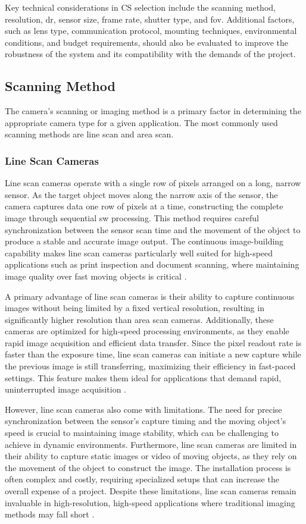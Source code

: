 Key technical considerations in CS selection include the scanning method, resolution, \gls{dr}, sensor size, frame rate, shutter type, and \gls{fov}. Additional factors, such as lens type, communication protocol, mounting techniques, environmental conditions, and budget requirements, should also be evaluated to improve the robustness of the system and its compatibility with the demands of the project.

\subsection{Scanning Method}
The camera's scanning or imaging method is a primary factor in determining the appropriate camera type for a given application. The most commonly used scanning methods are line scan and area scan.

\subsubsection{Line Scan Cameras}
Line scan cameras operate with a single row of pixels arranged on a long, narrow sensor. As the target object moves along the narrow axis of the sensor, the camera captures data one row of pixels at a time, constructing the complete image through sequential \gls{sw} processing. This method requires careful synchronization between the sensor scan time and the movement of the object to produce a stable and accurate image output. The continuous image-building capability makes line scan cameras particularly well suited for high-speed applications such as print inspection and document scanning, where maintaining image quality over fast moving objects is critical \cite{AS_VS_LS_ART}.

A primary advantage of line scan cameras is their ability to capture continuous images without being limited by a fixed vertical resolution, resulting in significantly higher resolution than area scan cameras. Additionally, these cameras are optimized for high-speed processing environments, as they enable rapid image acquisition and efficient data transfer. Since the pixel readout rate is faster than the exposure time, line scan cameras can initiate a new capture while the previous image is still transferring, maximizing their efficiency in fast-paced settings. This feature makes them ideal for applications that demand rapid, uninterrupted image acquisition \cite{AS_VS_LS_ART}.

However, line scan cameras also come with limitations. The need for precise synchronization between the sensor’s capture timing and the moving object’s speed is crucial to maintaining image stability, which can be challenging to achieve in dynamic environments. Furthermore, line scan cameras are limited in their ability to capture static images or video of moving objects, as they rely on the movement of the object to construct the image. The installation process is often complex and costly, requiring specialized setups that can increase the overall expense of a project. Despite these limitations, line scan cameras remain invaluable in high-resolution, high-speed applications where traditional imaging methods may fall short \cite{AS_VS_LS_ART}.

